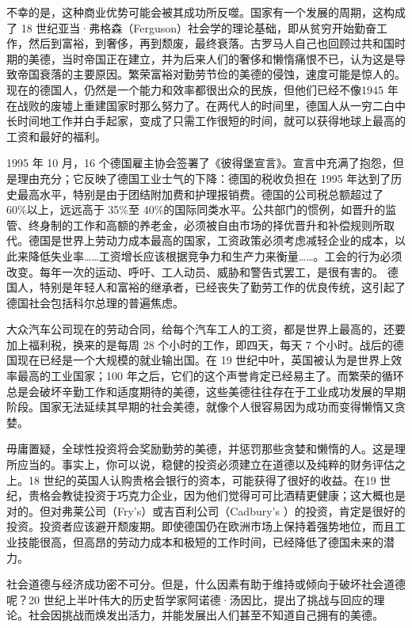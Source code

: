 不幸的是，这种商业优势可能会被其成功所反噬。国家有一个发展的周期，这构成了 18 世纪亚当·弗格森（Ferguson）社会学的理论基础，即从贫穷开始勤奋工作，然后到富裕，到奢侈，再到颓废，最终衰落。古罗马人自己也回顾过共和国时期的美德，当时帝国正在建立，并为后来人们的奢侈和懒惰痛恨不已，认为这是导致帝国衰落的主要原因。繁荣富裕对勤劳节俭的美德的侵蚀，速度可能是惊人的。现在的德国人，仍然是一个能力和效率都很出众的民族，但他们已经不像1945 年在战败的废墟上重建国家时那么努力了。在两代人的时间里，德国人从一穷二白中长时间地工作并白手起家，变成了只需工作很短的时间，就可以获得地球上最高的工资和最好的福利。

1995 年 10 月，16 个德国雇主协会签署了《彼得堡宣言》。宣言中充满了抱怨，但是理由充分；它反映了德国工业士气的下降：德国的税收负担在 1995 年达到了历史最高水平，特别是由于团结附加费和护理报销费。德国的公司税总额超过了 60\%以上，远远高于 35\%至 40\%的国际同类水平。公共部门的惯例，如晋升的监管、终身制的工作和高额的养老金，必须被自由市场的择优晋升和补偿规则所取代。德国是世界上劳动力成本最高的国家，工资政策必须考虑减轻企业的成本，以此来降低失业率……工资增长应该根据竞争力和生产力来衡量……。工会的行为必须改变。每年一次的运动、呼吁、工人动员、威胁和警告式罢工，是很有害的。 德国人，特别是年轻人和富裕的继承者，已经丧失了勤劳工作的优良传统，这引起了德国社会包括科尔总理的普遍焦虑。

大众汽车公司现在的劳动合同，给每个汽车工人的工资，都是世界上最高的，还要加上福利税，换来的是每周 28 个小时的工作，即四天，每天 7 个小时。战后的德国现在已经是一个大规模的就业输出国。在 19 世纪中叶，英国被认为是世界上效率最高的工业国家；100 年之后，它们的这个声誉肯定已经易主了。而繁荣的循环总是会破坏辛勤工作和适度期待的美德，这些美德往往存在于工业成功发展的早期阶段。国家无法延续其早期的社会美德，就像个人很容易因为成功而变得懒惰又贪婪。

毋庸置疑，全球性投资将会奖励勤劳的美德，并惩罚那些贪婪和懒惰的人。这是理所应当的。事实上，你可以说，稳健的投资必须建立在道德以及纯粹的财务评估之上。18 世纪的英国人认购贵格会银行的资本，可能获得了很好的收益。在19 世纪，贵格会教徒投资于巧克力企业，因为他们觉得可可比酒精更健康；这大概也是对的。但对弗莱公司（Fry’s）或吉百利公司（Cadbury’s ）的投资，肯定是很好的投资。投资者应该避开颓废期。即使德国仍在欧洲市场上保持着强势地位，而且工业技能很高，但高昂的劳动力成本和极短的工作时间，已经降低了德国未来的潜力。

社会道德与经济成功密不可分。但是，什么因素有助于维持或倾向于破坏社会道德呢？20 世纪上半叶伟大的历史哲学家阿诺德·汤因比，提出了挑战与回应的理论。社会因挑战而焕发出活力，并能发展出人们甚至不知道自己拥有的美德。

